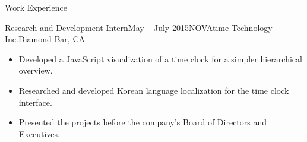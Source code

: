 \documentclass{resume} %
\begin{document}
\begin{rSection}{Work Experience}
\begin{rSubsection}{Research and Development Intern}{May -- July 2015}{NOVAtime Technology Inc.}{Diamond Bar, CA}
\renewcommand\labelitemi{$\cdot$}
\begin{itemize}
\setlength\itemsep{-0.25em}
\item Developed a JavaScript visualization of a time clock for a simpler hierarchical overview. 
\item Researched and developed Korean language localization for the time clock interface.
\item Presented the projects before the company's Board of Directors and Executives.\end{itemize}
\end{rSubsection}

\end{rSection}
\end{document}
